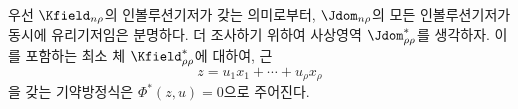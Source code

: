
우선 $\Kfield_{n\rho}$의 인볼루션기저가 갖는 의미로부터, $\Jdom_{n\rho}$의 모든 인볼루션기저가 동시에 유리기저임은 분명하다. 더 조사하기 위하여 사상영역 $\Jdom^*_{\rho\rho}$를 생각하자. 이를 포함하는 최소 체 $\Kfield^*_{\rho\rho}$에 대하여, 근
\[
z=u_1x_1+\cdots+u_\rho x_\rho
\]
을 갖는 기약방정식은 $\Phi^*(z,u)=0$으로 주어진다.
